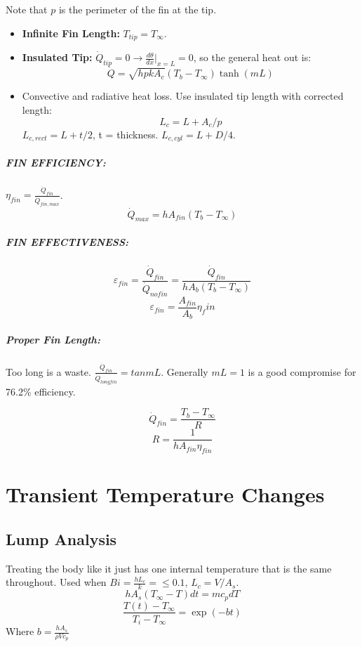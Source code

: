 \documentclass[a4paper,12pt]{report}
\begin{document}
Note that $p$ is the perimeter of the fin at the tip.

\begin{itemize}
\item \textbf{Infinite Fin Length: } $T_{tip} = T_\infty$.
\item \textbf{Insulated Tip: } $\dot{Q}_{tip} = 0 \to \frac{d\theta}{dx}|_{x=L} = 0$, so the general heat out is:
$$\dot{Q} = \sqrt{hp kA_c}(T_b-T_\infty) \tanh(mL)$$
\item Convective and radiative heat loss. Use insulated tip length with corrected length:$$L_c = L + A_c/p$$
$L_{c,rect} = L + t/2$, t = thickness. $L_{c, cyl} = L + D/4$. 

\end{itemize}

\paragraph{FIN EFFICIENCY: } $\eta_{fin} = \frac{\dot{Q}_{fin}}{\dot{Q}_{fin, max}}$. 
$$\dot{Q}_{max} = hA_{fin}(T_b-T_\infty)$$

\paragraph{FIN EFFECTIVENESS: } $$\varepsilon_{fin} = \frac{\dot{Q}_{fin}}{\dot{Q}_{nofin}} = \frac{\dot{Q}_{fin}}{hA_b(T_b-T_\infty)}$$
$$\varepsilon_{fin} = \frac{A_{fin}}{A_b}\eta_fin$$

\paragraph{Proper Fin Length: } Too long is a waste. $\frac{\dot{Q}_{fin}}{\dot{Q}_{long fin}} = tan{mL}$. Generally $mL = 1$ is a good compromise
for 76.2\% efficiency. 

$$\dot{Q}_{fin} = \frac{T_b-T_\infty}{R}$$
$$R = \frac{1}{hA_{fin}\eta_{fin}}$$

\chapter{Transient Temperature Changes}
\section{Lump Analysis}
Treating the body like it just has one internal temperature that is the same throughout. Used when $Bi = \frac{hL_c}{k} = \leq 0.1$, $L_c = V/A_s$. 
$$hA_s(T_\infty - T) dt = mc_p dT$$
$$\frac{T(t) - T_\infty}{T_i - T_\infty} = \exp(-bt)$$ 
Where $b = \frac{hA_s}{\rho V c_p}$
\end{document}
